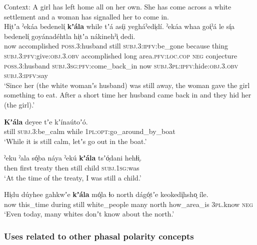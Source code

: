 
 \begin{exe}
 
 	\ex\label{exAppendixSlave1}
	Context: A girl has left home all on her own. She has come across a white settlement and a woman has signalled her to come in. \\
	\gll Hi̜tʼa ˀekáa bedenelí̜ \textbf{kʼála} while tʼá así̜i yegháˀedi̜dí. ˀekáa whaa goi̜ˀá le sí̜a bedenelí̜ goyánadéhtla hi̜tʼa nákinehˀi̜ dedi.\\
	now accomplished \textsc{poss}.3:husband still \textsc{subj}.3:\textsc{ipfv}:be\_gone because thing \textsc{subj}.3:\textsc{pfv}:give:\textsc{obj}.3.\textsc{obv} accomplished long area.\textsc{pfv}:\textsc{loc}.\textsc{cop} \textsc{neg} conjecture \textsc{poss}.3:husband \textsc{subj}.3\textsc{sg}:\textsc{pfv}:come\_back\_in now \textsc{subj}.3\textsc{pl}:\textsc{ipfv}:hide:\textsc{obj}.3.\textsc{obv} \textsc{subj}.3:\textsc{ipfv}:say\\
	\glt \lq Since her (the white womanʼs husband) was still away, the woman gave the girl something to eat. After a short time her husband came back in and they hid her (the girl).\rq{ }\parencite[1341, 1350]{Rice1989}
 
 	\ex\label{exAppendixSlave2}
	\gll \textbf{Kʼála} deyee tʼe kʼínaútoʼó.\\
	still \textsc{subj}.3:be\_calm while 1\textsc{pl}:\textsc{opt}:go\_around\_by\_boat\\
	\glt \lq While it is still calm, letʼs go out in the boat.' \parencite[1058]{Rice1989}
	
 	\ex\label{exAppendixSlave3}
	\gll ˀeku	ˀala	{só̙ba 	náya} ˀekú	 \textbf{kʼála} tsʼó̜dani		hehɬi̜.\\
	then	first	treaty	then		still	child		\textsc{subj}.1\textsc{sg}:was\\
	\glt \lq At the time of the treaty, I was still a child.\rq{ }\parencite[345]{Rice1989}
	
	\ex\label{exAppendixSlave4}
	\gll Hi̜du {dúyhee gahkwʼe} \textbf{kʼála} mó̙la ɬo north dágó̜tʼe keokedi̙hsho̙ íle.\\
	now this\_time during still white\_people many north how\_area\_is 3\textsc{pl}.know \textsc{neg}\\
	\glt \lq Even today, many whites donʼt know about the north.\rq{ }\parencite[346]{Rice1989}


 \end{exe}
 
\subsubsection{Uses related to other phasal polarity concepts} 
 
